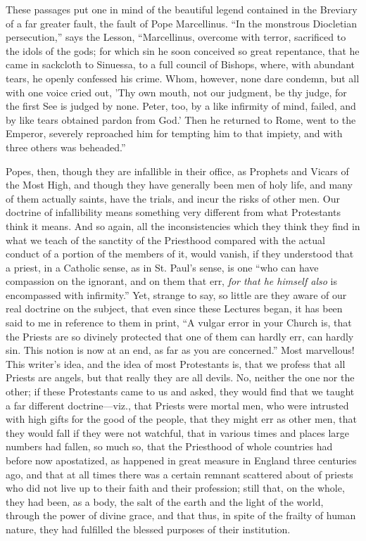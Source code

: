 These passages put one in mind of the beautiful legend
contained in the Breviary of a far greater fault, the
fault of Pope Marcellinus. ``In the monstrous
Diocletian persecution,'' says the Lesson,
``Marcellinus, overcome with terror, sacrificed to
the idols of the gods; for which sin he soon conceived so
great repentance, that he came in sackcloth to Sinuessa,
to a full council of Bishops, where, with abundant tears,
he openly confessed his crime. Whom, however, none dare
condemn, but all with one voice cried out, 'Thy own
mouth, not our judgment, be thy judge, for the first See
is judged by none. Peter, too, by a like infirmity of
mind, failed, and by like tears obtained pardon from
God.' Then he returned to Rome, went to the Emperor,
severely reproached him for tempting him to that impiety,
and with three others was beheaded.''

Popes, then, though they are infallible in their
office, as Prophets and Vicars of the Most High, and
though they have generally been men of holy life, and
many of them actually saints, have the trials, and incur
the risks of other men. Our doctrine of infallibility
means something very different from what Protestants
think it means. And so again, all the inconsistencies
which they think they find in what we teach of the
sanctity of the Priesthood compared with the actual
conduct of a portion of the members of it, would vanish,
if they understood that a priest, in a Catholic sense, as
in St. Paul's sense, is one ``who can have compassion
on the ignorant, and on them that err, \emph{for that he
himself also} is encompassed with infirmity.''
Yet, strange to say, so little are they aware of our real
doctrine on the subject, that even since these Lectures
began, it has been said to me in reference to them in print,
``A vulgar error in
your Church is, that the Priests are so divinely
protected that one of them can hardly err, can hardly
sin. This notion is now at an end, as far as you are
concerned.'' Most marvellous! This writer's idea, and
the idea of most Protestants is, that we profess that all
Priests are angels, but that really they are all devils.
No, neither the one nor the other; if these Protestants
came to us and asked, they would find that we taught a
far different doctrine—viz., that Priests were mortal
men, who were intrusted with high gifts for the good of
the people, that they might err as other men, that they
would fall if they were not watchful, that in various
times and places large numbers had fallen, so much so,
that the Priesthood of whole countries had before now
apostatized, as happened in great measure in England
three centuries ago, and that at all times there was a
certain remnant scattered about of priests who did not
live up to their faith and their profession; still that,
on the whole, they had been, as a body, the salt of the
earth and the light of the world, through the power of
divine grace, and that thus, in spite of the frailty of
human nature, they had fulfilled the blessed purposes of
their institution.

